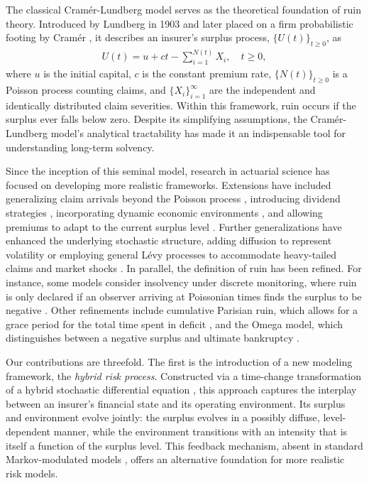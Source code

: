 \documentclass[11pt]{article}
\numberwithin{table}{section}
\numberwithin{figure}{section}
\numberwithin{equation}{section}
\newcommand{\1}{{\mathbf 1}}
\newcommand{\0}{\mat{0}}
\begin{document}
The classical Cram\'er-Lundberg model serves as the theoretical foundation of ruin theory. Introduced by Lundberg in 1903 \cite{lundberg1903approximerad} and later placed on a firm probabilistic footing by Cram\'er \cite{cramer1959mathematical}, it describes an insurer's surplus process, $\{U(t)\}_{t \ge 0}$, as
\begin{align}\label{eq:intro1}
U(t) = u + c t - \sum_{i=1}^{N(t)} X_i, \quad t \ge 0,
\end{align}
where $u$ is the initial capital, $c$ is the constant premium rate, $\{N(t)\}_{t \ge 0}$ is a Poisson process counting claims, and $\{X_i\}_{i=1}^\infty$ are the independent and identically distributed claim severities. Within this framework, ruin occurs if the surplus ever falls below zero. Despite its simplifying assumptions, the Cram\'er-Lundberg model's analytical tractability has made it an indispensable tool for understanding long-term solvency.

Since the inception of this seminal model, research in actuarial science has focused on developing more realistic frameworks. Extensions have included generalizing claim arrivals beyond the Poisson process \cite{anderson1957ruin}, introducing dividend strategies \cite{definetti1957dividens, avanzi2009strategies}, incorporating dynamic economic environments \cite{asmussen1989risk}, and allowing premiums to adapt to the current surplus level \cite{Taylor01041980}. Further generalizations have enhanced the underlying stochastic structure, adding diffusion to represent volatility \cite{gerber1970extension} or employing general L\'evy processes to accommodate heavy-tailed claims and market shocks \cite{kluppelberg2004ruin}. In parallel, the definition of ruin has been refined. For instance, some models consider insolvency under discrete monitoring, where ruin is only declared if an observer arriving at Poissonian times finds the surplus to be negative \cite{albrecher2017strikingly}. Other refinements include cumulative Parisian ruin, which allows for a grace period for the total time spent in deficit \cite{guerin2017distribution, bladt2019parisian}, and the Omega model, which distinguishes between a negative surplus and ultimate bankruptcy \cite{albrecher2011gammaomega,gerber2012omega}.

Our contributions are threefold. The first is the introduction of a new modeling framework, the \textit{hybrid risk process}. Constructed via a time-change transformation of a hybrid stochastic differential equation \cite{asmussen2002erlangian,stanford2005phase,bladt2019parisian,peralta2023ruin}, this approach captures the interplay between an insurer's financial state and its operating environment. Its surplus and environment evolve jointly: the surplus evolves in a possibly diffuse, level-dependent manner, while the environment transitions with an intensity that is itself a function of the surplus level. This feedback mechanism, absent in standard Markov-modulated models \cite{asmussen2010ruin}, offers an alternative foundation for more realistic risk models.
\end{document}
